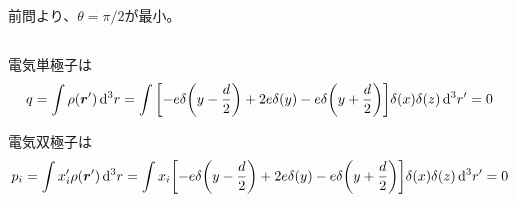 \documentclass[../../sp_2022.tex]{subfiles}
\begin{document}
\subsection{}
前問より、\(\theta = \pi/2\)が最小。

\subsection{}
電気単極子は
\begin{equation}\begin{aligned}[b]
    q = \int \rho(\vb*{r}')\dd[3]{r}
    = \int \qty[-e\delta\qty(y-\frac{d}{2})+2e\delta\qty(y)-e\delta\qty(y+\frac{d}{2})]\delta(x)\delta(z)\dd[3]{r'}
    = 0
\end{aligned}\end{equation}

電気双極子は
\begin{equation}\begin{aligned}[b]
    p_i = \int x_i'\rho(\vb*{r}')\dd[3]{r}
    = \int x_i \qty[-e\delta\qty(y-\frac{d}{2})+2e\delta\qty(y)-e\delta\qty(y+\frac{d}{2})]\delta(x)\delta(z)\dd[3]{r'}
    = 0
\end{aligned}\end{equation}
\end{document}
